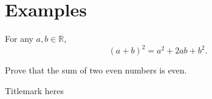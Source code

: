 \documentclass[12pt]{article}
\begin{document}
\section{Examples}

\begin{greentheorem}{}{}
For any $a,b \in \mathbb{R}$,
\[
(a+b)^2 = a^2 + 2ab + b^2.
\]
\end{greentheorem}

\begin{question}{}{}
Prove that the sum of two even numbers is even.
\end{question}

\begin{plain}{Title}{mark}
  heres
\end{plain}
\end{document}
